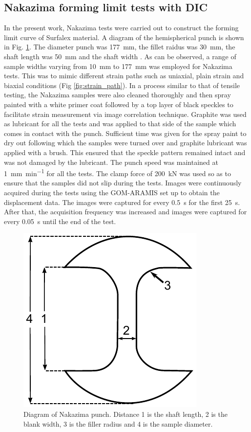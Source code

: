 \documentclass[11pt]{article} %
\begin{document}
\subsection{Nakazima forming limit tests with DIC}
In the present work, Nakazima tests were carried out to construct the forming limit curve of Surfalex material. A diagram of the hemispherical punch is shown in Fig. \ref{fig:punch}. The diameter punch was \SI{177}{\milli\meter}, the fillet raidus was \SI{30}{\milli\meter}, the shaft length was \SI{50}{\milli\meter} and the shaft width . As can be observed, a range of sample widths varying from \SI{10}{\milli\meter} to \SI{177}{\milli\meter} was employed for Nakazima tests. This was to mimic different strain paths such as uniaxial, plain strain and biaxial conditions (Fig \ref{fig:strain_path}). In a process similar to that of tensile testing, the Nakazima samples were also cleaned thoroughly and then spray painted with a white primer coat followed by a top layer of black speckles to facilitate strain measurement via image correlation technique. Graphite was used as lubricant for all the tests and was applied to that side of the sample which comes in contact with the punch. Sufficient time was given for the spray paint to dry out following which the samples were turned over and graphite lubricant was applied with a brush. This ensured that the speckle pattern remained intact and was not damaged by the lubricant. The punch speed was maintained at \SI{1}{\milli\meter\per\minute} for all the tests. The clamp force of \SI{200}{\kilo\newton} was used so as to ensure that the samples did not slip during the tests. Images were continuously acquired during the tests using the GOM-ARAMIS set up to obtain the displacement data. The images were captured for every \SI{0.5}{\second} for the first \SI{25}{\second}. After that, the acquisition frequency was increased and images were captured for every \SI{0.05}{\second} until the end of the test. 

\begin{figure}[h]
	\includegraphics{figures/nakazima_punch}
	\centering
	\caption{Diagram of Nakazima punch. Distance 1 is the shaft length, 2 is the blank width, 3 is the filler radius and 4 is the sample diameter.}
	\label{fig:punch}
\end{figure}
\end{document}
